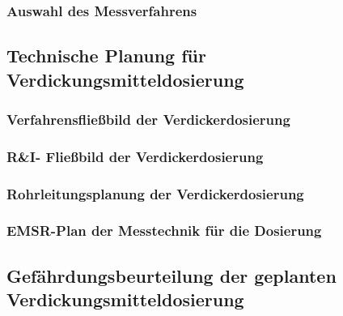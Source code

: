 
\subsubsection{Auswahl des Messverfahrens}

\subsection{Technische Planung für Verdickungsmitteldosierung}
\subsubsection{Verfahrensfließbild der Verdickerdosierung}
\subsubsection{R\&I- Fließbild der Verdickerdosierung}
\subsubsection{Rohrleitungsplanung der Verdickerdosierung}

\subsubsection{EMSR-Plan der Messtechnik für die Dosierung}

\subsection{Gefährdungsbeurteilung der geplanten Verdickungsmitteldosierung}


